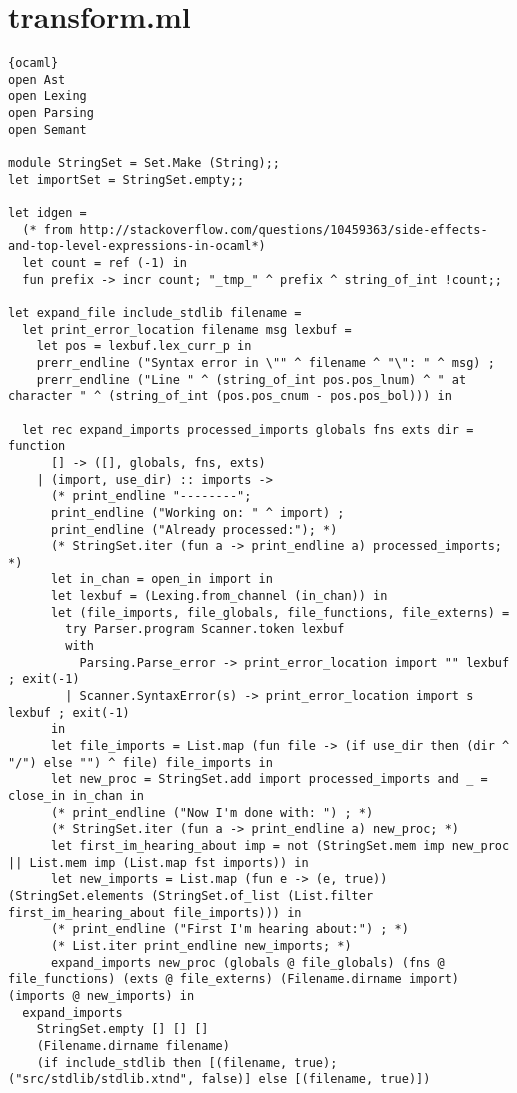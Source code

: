 \section{transform.ml}
\begin{lstlisting}{ocaml}
open Ast
open Lexing
open Parsing
open Semant

module StringSet = Set.Make (String);;
let importSet = StringSet.empty;;

let idgen =
  (* from http://stackoverflow.com/questions/10459363/side-effects-and-top-level-expressions-in-ocaml*)
  let count = ref (-1) in
  fun prefix -> incr count; "_tmp_" ^ prefix ^ string_of_int !count;;

let expand_file include_stdlib filename =
  let print_error_location filename msg lexbuf =
    let pos = lexbuf.lex_curr_p in
    prerr_endline ("Syntax error in \"" ^ filename ^ "\": " ^ msg) ;
    prerr_endline ("Line " ^ (string_of_int pos.pos_lnum) ^ " at character " ^ (string_of_int (pos.pos_cnum - pos.pos_bol))) in

  let rec expand_imports processed_imports globals fns exts dir = function
      [] -> ([], globals, fns, exts)
    | (import, use_dir) :: imports ->
      (* print_endline "--------";
      print_endline ("Working on: " ^ import) ;
      print_endline ("Already processed:"); *)
      (* StringSet.iter (fun a -> print_endline a) processed_imports; *)
      let in_chan = open_in import in
      let lexbuf = (Lexing.from_channel (in_chan)) in
      let (file_imports, file_globals, file_functions, file_externs) =
        try Parser.program Scanner.token lexbuf
        with
          Parsing.Parse_error -> print_error_location import "" lexbuf ; exit(-1)
        | Scanner.SyntaxError(s) -> print_error_location import s lexbuf ; exit(-1)
      in
      let file_imports = List.map (fun file -> (if use_dir then (dir ^ "/") else "") ^ file) file_imports in
      let new_proc = StringSet.add import processed_imports and _ = close_in in_chan in
      (* print_endline ("Now I'm done with: ") ; *)
      (* StringSet.iter (fun a -> print_endline a) new_proc; *)
      let first_im_hearing_about imp = not (StringSet.mem imp new_proc || List.mem imp (List.map fst imports)) in
      let new_imports = List.map (fun e -> (e, true)) (StringSet.elements (StringSet.of_list (List.filter first_im_hearing_about file_imports))) in
      (* print_endline ("First I'm hearing about:") ; *)
      (* List.iter print_endline new_imports; *)
      expand_imports new_proc (globals @ file_globals) (fns @ file_functions) (exts @ file_externs) (Filename.dirname import) (imports @ new_imports) in
  expand_imports
    StringSet.empty [] [] []
    (Filename.dirname filename)
    (if include_stdlib then [(filename, true); ("src/stdlib/stdlib.xtnd", false)] else [(filename, true)])


\end{lstlisting}
